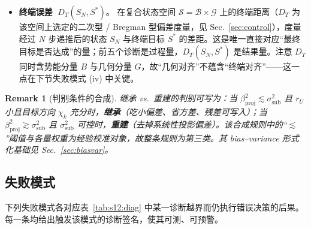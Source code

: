 \documentclass[11pt,a4paper]{article}
\newtheorem{remark}[theorem]{Remark}
\newcommand{\cS}{\mathcal{S}}   %
\newcommand{\cG}{\mathcal{G}}   %
\newcommand{\cB}{\mathcal{B}}   %
\begin{document}
\begin{itemize}
\item \textbf{终端误差} $\;D_T(S_N,S^*)$。\;
在复合状态空间 $\cS=\cB\times\cG$ 上的终端距离（$D_T$ 为该空间上选定的二次型 / Bregman 型偏差度量，见 Sec.~\ref{sec:control}），度量经过 $N$ 步递推后的状态 $S_N$ 与终端目标 $S^*$ 的差距。这是唯一直接对应“最终目标是否达成”的量；前五个诊断是过程量，$D_T(S_N,S^*)$ 是结果量。注意 $D_T$ 同时含势能分量 $B$ 与几何分量 $G$，故“几何对齐”不蕴含“终端对齐”——这一点在下节失败模式 (iv) 中关键。
\end{itemize}

\begin{remark}[判别条件的合成]\label{rem:s12:decision}
继承 vs.\ 重建的判别可写为：当 $\beta_{\mathrm{proj}}^2\lesssim\sigma_{\mathrm{sub}}^2$ 且 $r_U$ 小且目标方向 $\chi_k$ 充分时，\textbf{继承}（吃小偏差、省方差、残差可写入）；当 $\beta_{\mathrm{proj}}^2\gtrsim\sigma_{\mathrm{sub}}^2$ 且 $\sigma_{\mathrm{sub}}^2$ 可控时，\textbf{重建}（去掉系统性投影偏差）。该合成规则中的“$\lesssim$”阈值与各量权重为经验校准对象，故整条规则为第三类。其 bias--variance 形式化基础见 Sec.~\ref{sec:biasvar}。
\end{remark}

\subsection{失败模式}\label{ssec:s12:failure}

下列失败模式各对应表~\ref{tab:s12:diag} 中某一诊断越界而仍执行错误决策的后果。每一条均给出触发该模式的诊断签名，使其可测、可预警。
\end{document}
